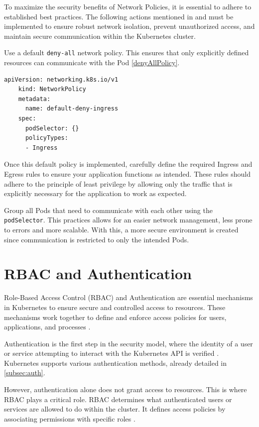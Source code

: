 \documentclass[a4paper,11pt,openright,BCOR=15mm]{scrbook}
\begin{document}
To maximize the security benefits of Network Policies, it is essential to adhere to established best practices. The following actions mentioned in \cite{amaechi_learn_2023} and \cite{de_tender_kubernetes_2022} must be implemented to ensure robust network isolation, prevent unauthorized access, and maintain secure communication within the Kubernetes cluster.

Use a default \texttt{deny-all} network policy. This ensures that only explicitly defined resources can communicate with the Pod \ref{denyAllPolicy}.

\begin{lstlisting}[style=yaml,caption={Deny All Default Policy example},label=code:denyAllPolicy]
	apiVersion: networking.k8s.io/v1
	kind: NetworkPolicy
	metadata:
	  name: default-deny-ingress
	spec:
	  podSelector: {}
	  policyTypes:
	  - Ingress
\end{lstlisting}

Once this default policy is implemented, carefully define the required Ingress and Egress rules to ensure your application functions as intended. These rules should adhere to the principle of least privilege by allowing only the traffic that is explicitly necessary for the application to work as expected.

Group all Pods that need to communicate with each other using the \texttt{podSelector}. This practices allows for an easier network management, less prone to errors and more scalable. With this, a more secure environment is created since communication is restricted to only the intended Pods.

	\section{RBAC and Authentication}
	\label{sec:auth}
	
Role-Based Access Control (RBAC) and Authentication are essential mechanisms in Kubernetes to ensure secure and controlled access to resources. These mechanisms work together to define and enforce access policies for users, applications, and processes \cite{rostami_role-based_2023}.

Authentication is the first step in the security model, where the identity of a user or service attempting to interact with the Kubernetes API is verified \cite{rostami_role-based_2023}. Kubernetes supports various authentication methods, already detailed in \ref{subsec:auth}.

However, authentication alone does not grant access to resources. This is where RBAC plays a critical role. RBAC determines what authenticated users or services are allowed to do within the cluster. It defines access policies by associating permissions with specific roles \cite{rostami_role-based_2023}.
\end{document}
